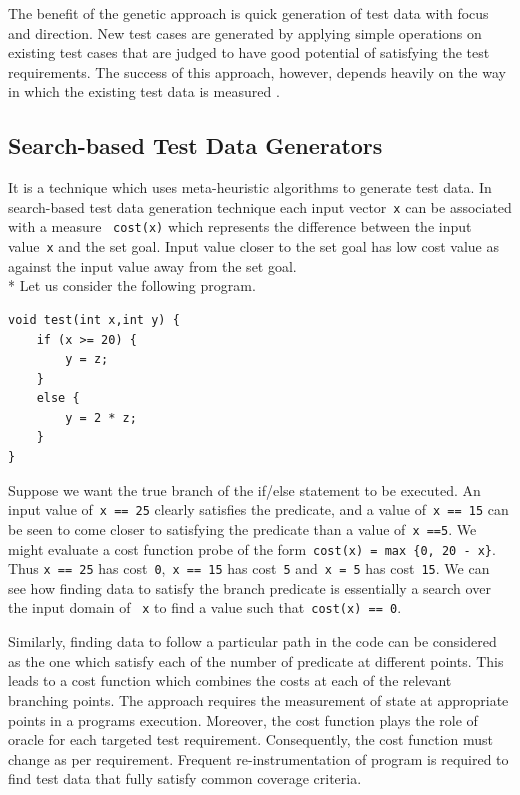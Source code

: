 The benefit of the genetic approach is quick generation of test data with focus and direction. New test cases are generated by applying simple operations on existing test cases that are judged to have good potential of satisfying the test requirements. The success of this approach, however, depends heavily on the way in which the existing test data is measured \cite{pargas1999test}.


\subsection{Search-based Test Data Generators}
It is a technique which uses meta-heuristic algorithms to generate test data. In search-based test data generation technique each input vector~\verb+x+ can be associated with a measure ~\verb+cost(x)+ which represents the difference between the input value~\verb+x+ and the set goal. Input value closer to the set goal has low cost value as against the input value away from the set goal. \\*
Let us consider the following program.


\begin{lstlisting}
void test(int x,int y) {
	if (x >= 20) {
		y = z; 
	}
	else {
		y = 2 * z;
	}
}
\end{lstlisting}

Suppose we want the true branch of the if/else statement to be executed. An input value of~\verb+x == 25+ clearly satisfies the predicate, and a value of~\verb+x == 15+ can be seen to come closer to satisfying the predicate than a value of~\verb+x ==5+. We might evaluate a cost function probe of the form~\verb+cost(x) = max {0, 20 - x}+. Thus \verb+x == 25+ has cost~\verb+0+,~\verb+x == 15+ has cost~\verb+5+ and~\verb+x = 5+ has cost~\verb+15+. We can see how finding data to satisfy the branch predicate is essentially a search over the input domain of ~\verb+x+ to find a value such that~\verb+cost(x) == 0+. 

Similarly, finding data to follow a particular path in the code can be considered as the one which satisfy each of the number of predicate at different points. This leads to a cost function which combines the costs at each of the relevant branching points. The approach requires the measurement of state at appropriate points in a programs execution. Moreover, the cost function plays the role of oracle for each targeted test requirement. Consequently, the cost function must change as per requirement. Frequent re-instrumentation of program is required to find test data that fully satisfy common coverage criteria. 

